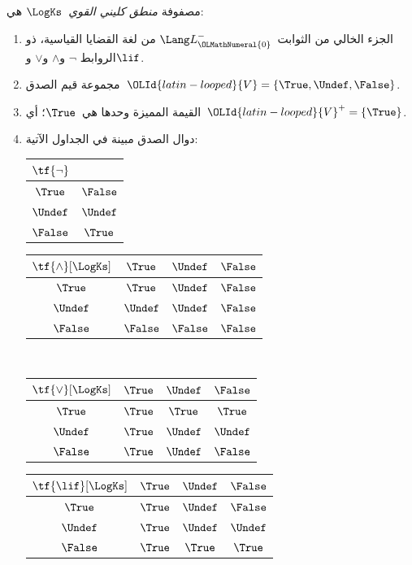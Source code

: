 \documentclass[../../../include/open-logic-section]{subfiles}
\begin{document}
\begin{defn}
مصفوفة \emph{منطق كليني القوي}~$\LogKs$ هي:
\begin{enumerate}
  \item الجزء الخالي من الثوابت~$\Lang L_\OLMathNumeral{0}^{-}$ من لغة القضايا القياسية، ذو الروابط
  $\lnot$ و$\land$ و$\lor$ و$\lif$.
  \item مجموعة قيم الصدق~$\OLId{latin-looped}{V} = \{\True, \Undef, \False\}$.
  \item القيمة المميزة وحدها هي~$\True$؛ أي~$\OLId{latin-looped}{V}^+ = \{\True\}$.
  \item دوال الصدق مبينة في الجداول الآتية:
  \begin{center}
    \begin{tabular}{c|c}
      $\tf{\lnot}$ & \\
      \hline
      $\True$ & $\False$ \\
      $\Undef$ & $\Undef$ \\
      $\False$ & $\True$
    \end{tabular}
    \quad
    \begin{tabular}{c|ccc}
      $\tf{\land}[\LogKs]$ & $\True$ & $\Undef$ & $\False$ \\
      \hline
      $\True$ & $\True$ & $\Undef$ & $\False$ \\
      $\Undef$ & $\Undef$ & $\Undef$ & $\False$\\
      $\False$ & $\False$ & $\False$ & $\False$
    \end{tabular}
    \\[2ex]
    \begin{tabular}{c|ccc}
      $\tf{\lor}[\LogKs]$ & $\True$ & $\Undef$ & $\False$ \\
      \hline
      $\True$ & $\True$ & $\True$ & $\True$ \\
      $\Undef$ & $\True$ & $\Undef$ & $\Undef$ \\
      $\False$ & $\True$ & $\Undef$ & $\False$
    \end{tabular}
    \quad
    \begin{tabular}{c|ccc}
      $\tf{\lif}[\LogKs]$ & $\True$ & $\Undef$ & $\False$ \\
      \hline
      $\True$ & $\True$ & $\Undef$ & $\False$ \\
      $\Undef$ & $\True$ & $\Undef$ & $\Undef$  \\
      $\False$ & $\True$ & $\True$ & $\True$
    \end{tabular}
  \end{center}
\end{enumerate}
\end{defn}
\end{document}
